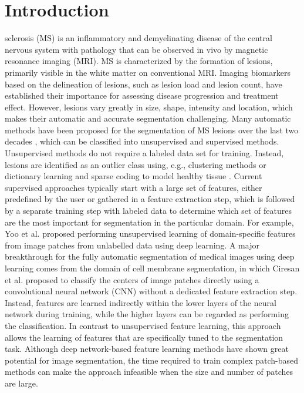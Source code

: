 \section{Introduction}

sclerosis (MS) is an inflammatory and demyelinating disease of the central
nervous system with pathology that can be observed in vivo by magnetic resonance
imaging (MRI). MS is characterized by the formation of lesions, primarily
visible in the white matter on conventional MRI. Imaging biomarkers based on the
delineation of lesions, such as lesion load and lesion count, have established
their importance for assessing disease progression and treatment effect.
However, lesions vary greatly in size, shape, intensity and location, which
makes their automatic and accurate segmentation challenging. Many automatic
methods have been proposed for the segmentation of MS \mbox{lesions} over the
last two decades \cite{garcia2013review}, which can be classified into
unsupervised and supervised methods. Unsupervised methods do not require a labeled data set for training.
Instead, lesions are identified as an outlier class using, e.g., clustering
methods \cite{souplet2008} or dictionary learning and sparse coding to model
healthy tissue \cite{weiss2013}. Current supervised approaches typically start
with a large set of features, either predefined by the user \cite{geremia2010}
or gathered in a feature extraction step, which is followed by a separate
training step with labeled data to determine which set of features are the most
important for segmentation in the particular domain. For example, Yoo et al.
\cite{yoo2014} proposed performing unsupervised learning of domain-specific
features from image patches from unlabelled data using deep learning. A major
breakthrough for the fully automatic segmentation of medical images using deep
learning comes from the domain of cell membrane segmentation, in which Ciresan
et al. \cite{Ciresan2012} proposed to classify the centers of image patches
directly using a convolutional neural network (CNN) \cite{LeCun1998} without a
dedicated feature extraction step. Instead, features are learned indirectly
within the lower layers of the neural network during training, while the higher
layers can be regarded as performing the classification. In contrast to
unsupervised feature learning, this approach allows the learning of features
that are specifically tuned to the segmentation task. Although deep
network-based feature learning methods have shown great potential for image
segmentation, the time required to train complex patch-based methods can make
the approach infeasible when the size and number of patches are large.

